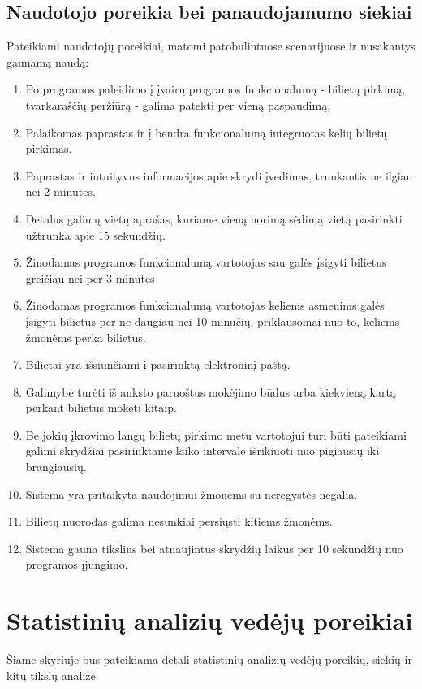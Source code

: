 \documentclass{VUMIFPSkursinis}
\begin{document}
\subsection{Naudotojo poreikia bei panaudojamumo siekiai}
Pateikiami naudotojų poreikiai, matomi patobulintuose scenarijuose ir nusakantys gaunamą naudą:
\begin{enumerate}[start=1,label={\bfseries S\arabic*}]
\item Po programos paleidimo į įvairų programos funkcionalumą - bilietų pirkimą, tvarkaraščių peržiūrą - galima patekti per vieną paspaudimą.
\item Palaikomas paprastas ir į bendra funkcionalumą integruotas kelių bilietų pirkimas.
\item Paprastas ir intuityvus informacijos apie skrydi įvedimas, trunkantis ne ilgiau nei 2 minutes.
\item Detalus galimų vietų aprašas, kuriame vieną norimą sėdimą vietą pasirinkti užtrunka apie 15 sekundžių.
\item Žinodamas programos funkcionalumą vartotojas sau galės įsigyti bilietus greičiau nei per 3 minutes
\item Žinodamas programos funkcionalumą vartotojas keliems asmenims galės įsigyti bilietus per ne daugiau nei 10 minučių, priklausomai nuo to, keliems žmonėms perka bilietus.
\item Bilietai yra išsiunčiami į pasirinktą elektroninį paštą.
\item Galimybė turėti iš anksto paruoštus mokėjimo būdus arba kiekvieną kartą perkant bilietus mokėti kitaip.
\item Be jokių įkrovimo langų bilietų pirkimo metu vartotojui turi būti pateikiami galimi skrydžiai pasirinktame laiko intervale išrikiuoti nuo pigiausių iki brangiausių.
\item Sistema yra pritaikyta naudojimui žmonėms su neregystės negalia.
\item Bilietų nuorodas galima nesunkiai persiųsti kitiems žmonėms.
\item Sistema gauna tikslius bei atnaujintus skrydžių laikus per 10 sekundžių nuo programos įjungimo.
\end{enumerate}

\section{Statistinių analizių vedėjų poreikiai}
Šiame skyriuje bus pateikiama detali statistinių analizių vedėjų poreikių, siekių ir kitų tikslų analizė.
\end{document}
